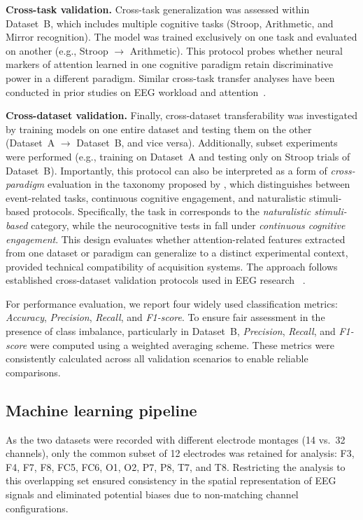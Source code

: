 \documentclass[utf8]{FrontiersinHarvard} %
\begin{document}
\textbf{Cross-task validation.}  
Cross-task generalization was assessed within Dataset~B, which includes multiple cognitive tasks (Stroop, Arithmetic, and Mirror recognition). The model was trained exclusively on one task and evaluated on another (e.g., Stroop $\rightarrow$ Arithmetic). This protocol probes whether neural markers of attention learned in one cognitive paradigm retain discriminative power in a different paradigm. Similar cross-task transfer analyses have been conducted in prior studies on EEG workload and attention~\citep{zhang2021cross}.  

\textbf{Cross-dataset validation.}  
Finally, cross-dataset transferability was investigated by training models on one entire dataset and testing them on the other (Dataset~A $\rightarrow$ Dataset~B, and vice versa). Additionally, subset experiments were performed (e.g., training on Dataset~A and testing only on Stroop trials of Dataset~B). Importantly, this protocol can also be interpreted as a form of \textit{cross-paradigm} evaluation in the taxonomy proposed by \cite{chen2025hybrid}, which distinguishes between event-related tasks, continuous cognitive engagement, and naturalistic stimuli-based protocols. Specifically, the task in \cite{aci2019attention} corresponds to the \textit{naturalistic stimuli-based} category, while the neurocognitive tests in \cite{ghosh2022sam40} fall under \textit{continuous cognitive engagement}. This design evaluates whether attention-related features extracted from one dataset or paradigm can generalize to a distinct experimental context, provided technical compatibility of acquisition systems. The approach follows established cross-dataset validation protocols  used in EEG research ~\citep{Lan2019DomainAdaptationEEG,nguyen2022kalman}.  


For performance evaluation, we report four widely used classification metrics: \textit{Accuracy}, \textit{Precision}, \textit{Recall}, and \textit{F1-score}. To ensure fair assessment in the presence of class imbalance, particularly in Dataset~B, \textit{Precision}, \textit{Recall}, and \textit{F1-score} were computed using a weighted averaging scheme. These metrics were consistently calculated across all validation scenarios to enable reliable comparisons.


\subsection{Machine learning pipeline}


As the two datasets were recorded with different electrode montages (14 vs.\ 32 channels), only the common subset of 12 electrodes was retained for analysis: F3, F4, F7, F8, FC5, FC6, O1, O2, P7, P8, T7, and T8. Restricting the analysis to this overlapping set ensured consistency in the spatial representation of EEG signals and eliminated potential biases due to non-matching channel configurations.
\end{document}
